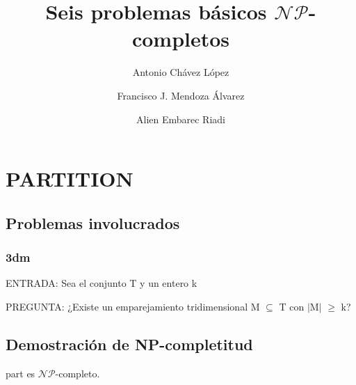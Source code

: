 \documentclass[11pt, a4paper]{memoir}
\title{\Huge Seis problemas básicos $\mathcal{NP}$-completos}
\author{Antonio Chávez López \and
Francisco J. Mendoza Álvarez \and
Alien Embarec Riadi
}
\begin{document}
\maketitle

\chapter{PARTITION}

\section{Problemas involucrados}

\subsection*{\gls{3dm}}

\noindent ENTRADA: Sea el conjunto T y un entero k 

\noindent PREGUNTA: ¿Existe un emparejamiento tridimensional M $\subseteq$ T con $\mid$M$\mid$ $\geq$ k? 


\section{Demostración de NP-completitud}

\begin{thm}
	\gls{part} es $\mathcal{NP}$-completo.
\end{thm}
\end{document}
